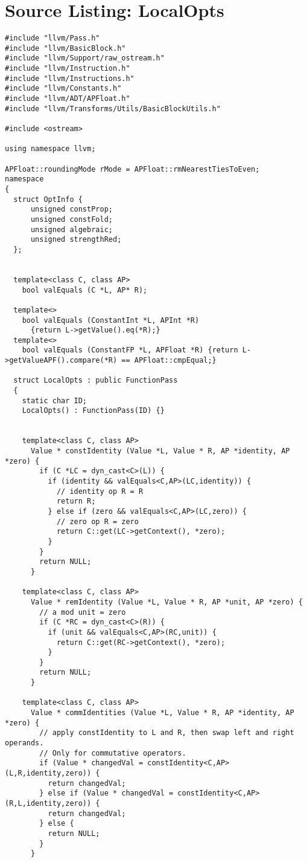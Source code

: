 \documentclass[12pt]{article}
\begin{document}
\section{Source Listing: LocalOpts}
\begin{verbatim}
#include "llvm/Pass.h"
#include "llvm/BasicBlock.h"
#include "llvm/Support/raw_ostream.h"
#include "llvm/Instruction.h"
#include "llvm/Instructions.h"
#include "llvm/Constants.h"
#include "llvm/ADT/APFloat.h"
#include "llvm/Transforms/Utils/BasicBlockUtils.h"

#include <ostream>

using namespace llvm;

APFloat::roundingMode rMode = APFloat::rmNearestTiesToEven;
namespace
{
  struct OptInfo {
      unsigned constProp;
      unsigned constFold;
      unsigned algebraic;
      unsigned strengthRed;
  };


  template<class C, class AP>
    bool valEquals (C *L, AP* R);

  template<>
    bool valEquals (ConstantInt *L, APInt *R) 
      {return L->getValue().eq(*R);}
  template<>
    bool valEquals (ConstantFP *L, APFloat *R) {return L->getValueAPF().compare(*R) == APFloat::cmpEqual;}

  struct LocalOpts : public FunctionPass
  {
    static char ID;
    LocalOpts() : FunctionPass(ID) {}


    template<class C, class AP>
      Value * constIdentity (Value *L, Value * R, AP *identity, AP *zero) {
        if (C *LC = dyn_cast<C>(L)) {
          if (identity && valEquals<C,AP>(LC,identity)) {
            // identity op R = R
            return R;
          } else if (zero && valEquals<C,AP>(LC,zero)) {
            // zero op R = zero
            return C::get(LC->getContext(), *zero);
          }
        } 
        return NULL;
      }

    template<class C, class AP>
      Value * remIdentity (Value *L, Value * R, AP *unit, AP *zero) {
        // a mod unit = zero
        if (C *RC = dyn_cast<C>(R)) {
          if (unit && valEquals<C,AP>(RC,unit)) {
            return C::get(RC->getContext(), *zero);
          }
        } 
        return NULL;
      }

    template<class C, class AP>
      Value * commIdentities (Value *L, Value * R, AP *identity, AP *zero) {
        // apply constIdentity to L and R, then swap left and right operands. 
        // Only for commutative operators.
        if (Value * changedVal = constIdentity<C,AP>(L,R,identity,zero)) {
          return changedVal;
        } else if (Value * changedVal = constIdentity<C,AP>(R,L,identity,zero)) {
          return changedVal;
        } else {
          return NULL;
        }
      }


\end{verbatim}
\end{document}
